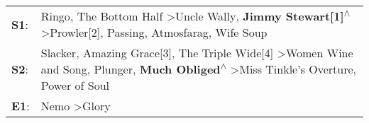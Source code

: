 \begin{supertabular}{p{0.03\textwidth}p{0.92\textwidth}}
 \textbf{S1}:  &                                 Ringo\textsuperscript{}, \enspace The Bottom Half\textsuperscript{} \textgreater \enspace Uncle Wally\textsuperscript{}, \enspace \textbf{Jimmy Stewart[1]\textsuperscript{$\wedge$}} \textgreater \enspace Prowler[2]\textsuperscript{}, \enspace Passing\textsuperscript{}, \enspace Atmosfarag\textsuperscript{}, \enspace Wife Soup\textsuperscript{}  \enspace  \\
 \textbf{S2}:  &  Slacker\textsuperscript{}, \enspace Amazing Grace[3]\textsuperscript{}, \enspace The Triple Wide[4]\textsuperscript{} \textgreater \enspace Women Wine and Song\textsuperscript{}, \enspace Plunger\textsuperscript{}, \enspace \textbf{Much Obliged\textsuperscript{$\wedge$}} \textgreater \enspace Miss Tinkle's Overture\textsuperscript{}, \enspace Power of Soul\textsuperscript{}  \enspace  \\
 \textbf{E1}:  &                                                                                                                                                                                                                                                                                                                      Nemo\textsuperscript{} \textgreater \enspace Glory\textsuperscript{}  \enspace  \\
\end{supertabular}
